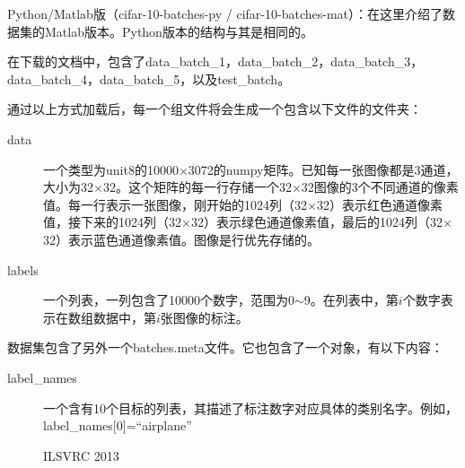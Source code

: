 Python/Matlab版（cifar-10-batches-py / cifar-10-batches-mat）：在这里介绍了数据集的Matlab版本。Python版本的结构与其是相同的。

在下载的文档中，包含了{\scriptsize{data\_batch\_1}}，{\scriptsize{data\_batch\_2}}，{\scriptsize{data\_batch\_3}}，{\scriptsize{data\_batch\_4}}，{\scriptsize{data\_batch\_5}}，以及{\scriptsize{test\_batch}}。%

\begin{comment}
\begin{python}
def unpickle(file)
  Import cPickle
  fo=open(file,'rb')
  dict=cPickle.load(fo)
  fo.close()
  return dict
\end{python} 
\end{comment}

通过以上方式加载后，每一个组文件将会生成一个包含以下文件的文件夹：
\begin{description}
\item[data] 一个类型为unit8的10000$\times$3072的numpy矩阵。已知每一张图像都是3通道，大小为32$\times$32。这个矩阵的每一行存储一个32$\times$32图像的3个不同通道的像素值。每一行表示一张图像，刚开始的1024列（32$\times$32）表示红色通道像素值，接下来的1024列（32$\times$32）表示绿色通道像素值，最后的1024列（32$\times$32）表示蓝色通道像素值。图像是行优先存储的。%
\item[labels] 一个列表，一列包含了10000个数字，范围为0$\sim$9。在列表中，第$i$个数字表示在数组数据中，第$i$张图像的标注。
\end{description}

数据集包含了另外一个{\scriptsize{batches.meta}}文件。它也包含了一个对象，有以下内容：
\begin{description}
\item[label\_names] 一个含有10个目标的列表，其描述了标注数字对应具体的类别名字。例如，label\_names[0]=``airplane''
\end{description}


\begin{figure}[!ht]
  \centering 
  \caption{ILSVRC 2013}
\end{figure}


